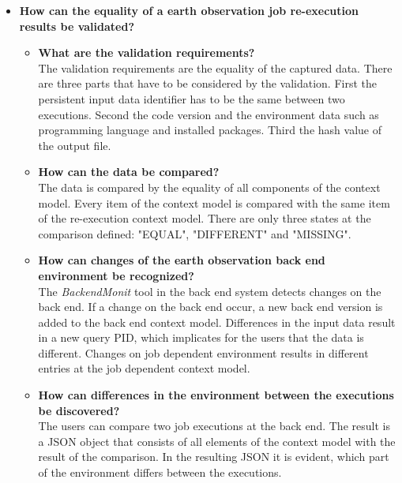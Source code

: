 \documentclass[draft,final]{vutinfth} %
\begin{document}
\begin{itemize}
\begin{itemize}
	\end{itemize}
	\item \textbf{How can the equality of a earth observation job re-execution results be validated?}
	\begin{itemize}
		\item \textbf{What are the validation requirements?} \\
		The validation requirements are the equality of the captured data. There are three parts that have to be considered by the validation. First the persistent input data identifier has to be the same between two executions. Second the code version and the environment data such as programming language and installed packages. Third the hash value of the output file.
		\item \textbf{How can the data be compared?} \\
		The data is compared by the equality of all components of the context model. Every item of the context model is compared with the same item of the re-execution context model. There are only three states at the comparison defined: "EQUAL", "DIFFERENT" and "MISSING".
		\item \textbf{How can changes of the earth observation back end environment be recognized?} \\
		The \textit{BackendMonit} tool in the back end system detects changes on the back end. If a change on the back end occur, a new back end version is added to the back end context model. Differences in the input data result in a new query PID, which implicates for the users that the data is different. Changes on job dependent environment results in different entries at the job dependent context model.  
		\item \textbf{How can differences in the environment between the executions be discovered?} \\
		The users can compare two job executions at the back end. The result is a JSON object that consists of all elements of the context model with the result of the comparison. In the resulting JSON it is evident, which part of the environment differs between the executions.  
	\end{itemize}
\end{itemize}
\end{document}
